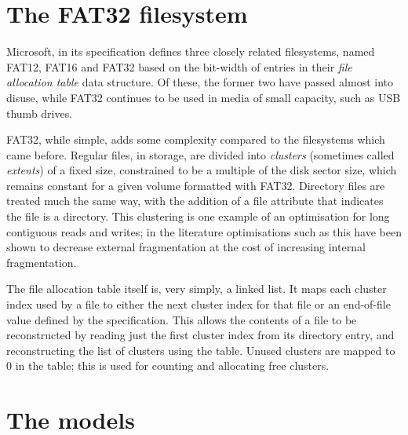 \documentclass[runningheads,a4paper]{llncs}
\begin{document}
\section{The FAT32 filesystem}

Microsoft, in its specification \cite{microsoft_2000} defines three
closely related filesystems, named FAT12, FAT16 and FAT32 based on the
bit-width of entries in their \textit{file allocation table} data
structure. Of these, the former two have passed almost into disuse,
while FAT32 continues to be used in media of small capacity, such as
USB thumb drives.

FAT32, while simple, adds some complexity compared to the filesystems
which came before. Regular files, in storage, are divided into
\textit{clusters} (sometimes called \textit{extents}) of a fixed size,
constrained to be a multiple of the disk sector size, which remains
constant for a given volume formatted
with FAT32. Directory files are treated much the same way, with the
addition of a file attribute that indicates the file is a
directory. This clustering is one example of an optimisation for long
contiguous reads and writes; in the literature optimisations such as
this have been shown to decrease external fragmentation at the cost of
increasing internal fragmentation.

The file allocation table itself is, very simply, a linked list. It
maps each cluster index used by a file to either the next cluster index
for that file or an end-of-file value defined by the
specification. This allows the contents of a file to be reconstructed
by reading just the first cluster index from its directory entry, and
reconstructing the list of clusters using the table. Unused clusters
are mapped to 0 in the table; this is used for counting and allocating
free clusters.

\section{The models}
\end{document}
